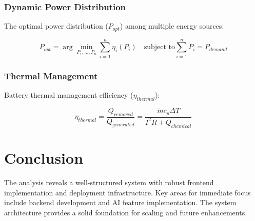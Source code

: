 \documentclass[12pt,a4paper]{article}
\begin{document}
\subsubsection{Dynamic Power Distribution}
The optimal power distribution (\(P_{opt}\)) among multiple energy sources:

\begin{equation}
P_{opt} = \arg\min_{P_1,\ldots,P_n} \sum_{i=1}^{n} \eta_i(P_i) \quad \text{subject to} \sum_{i=1}^{n} P_i = P_{demand}
\end{equation}

\subsubsection{Thermal Management}
Battery thermal management efficiency (\(\eta_{thermal}\)):

\begin{equation}
\eta_{thermal} = \frac{Q_{removed}}{Q_{generated}} = \frac{\dot{m}c_p\Delta T}{I^2R + Q_{chemical}}
\end{equation}

\section{Conclusion}
The analysis reveals a well-structured system with robust frontend implementation and deployment infrastructure. Key areas for immediate focus include backend development and AI feature implementation. The system architecture provides a solid foundation for scaling and future enhancements.
\end{document}
